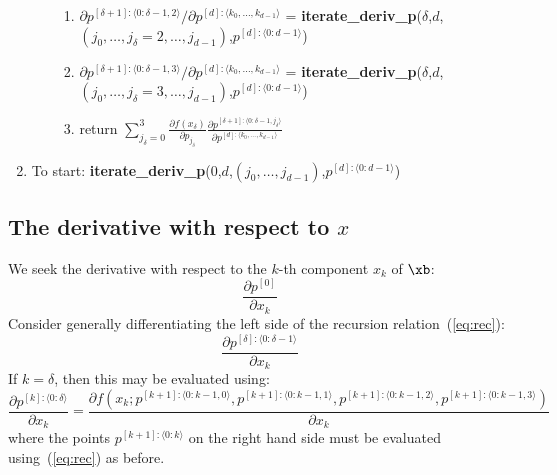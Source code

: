 \documentclass[11pt]{article}
\begin{document}
\begin{enumerate}
\begin{enumerate}
\begin{enumerate}
\item $\partial p^{[\delta+1]:\langle 0: \delta-1, 2 \rangle} / \partial p^{[d] : \langle k_0, \dots, k_{d-1} \rangle}$ = \textbf{iterate\_deriv\_p}($\delta$,$d$,$(j_0, \dots, j_\delta=2, \dots, j_{d-1})$,$p^{[d]:\langle 0:d-1 \rangle}$)
\item $\partial p^{[\delta+1]:\langle 0: \delta-1, 3 \rangle} / \partial p^{[d] : \langle k_0, \dots, k_{d-1} \rangle}$ = \textbf{iterate\_deriv\_p}($\delta$,$d$,$(j_0, \dots, j_\delta=3, \dots, j_{d-1})$,$p^{[d]:\langle 0:d-1 \rangle}$)
\item return $\sum_{j_\delta=0}^3 
\frac{
\partial f(x_\delta)
}{
\partial p_{j_\delta}
}
\frac{\partial p^{[\delta+1]: \langle 0:\delta-1,j_\delta \rangle}
}{
\partial p^{[d]: \langle k_0, \dots, k_{d-1} \rangle}
}
$
\end{enumerate}
\end{enumerate}

\item To start: \textbf{iterate\_deriv\_p}(0,$d$,$(j_0, \dots, j_{d-1})$,$p^{[d]:\langle 0:d-1 \rangle}$)
\end{enumerate}




\subsection{The derivative with respect to $x$}


We seek the derivative with respect to the $k$-th component $x_k$ of $\xb$:
\begin{equation}
\frac{\partial p^{[0]}}{\partial x_k}
\end{equation}
Consider generally differentiating the left side of the recursion relation~(\ref{eq:rec}):
\begin{equation}
\frac{\partial p^{[\delta]: \langle 0:\delta-1 \rangle} }{\partial x_k} 
\end{equation}
If $k = \delta$, then this may be evaluated using:
\begin{equation}
\frac{\partial p^{[k]: \langle 0:\delta \rangle}
}{
\partial x_k
}
=
\frac{\partial 
f \left ( 
x_{k} ; 
p^{[k+1]: \langle 0:k-1,0 \rangle},
p^{[k+1]: \langle 0:k-1,1 \rangle},
p^{[k+1]: \langle 0:k-1,2 \rangle},
p^{[k+1]: \langle 0:k-1,3 \rangle}
\right ) 
}{
\partial x_k
}
\label{eq:evalk}
\end{equation}
where the points $p^{[k+1]: \langle 0:k \rangle}$ on the right hand side must be evaluated using~(\ref{eq:rec}) as before.
\end{document}
